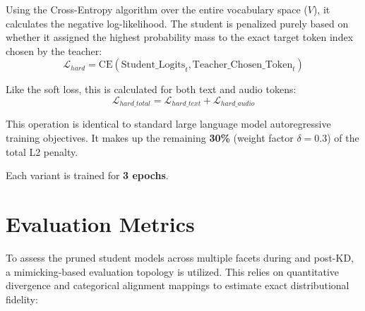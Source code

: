 \documentclass[12pt]{article}
\begin{document}
Using the Cross-Entropy algorithm over the entire vocabulary space ($V$), it calculates the negative log-likelihood. The student is penalized purely based on whether it assigned the highest probability mass to the exact target token index chosen by the teacher:
\[
\mathcal{L}_{hard} = \text{CE}({\mathrm{Student\_Logits}}_{t}, {\mathrm{Teacher\_Chosen\_Token}}_{t})
\]

Like the soft loss, this is calculated for both text and audio tokens:
\[
\mathcal{L}_{hard\_total} = \mathcal{L}_{hard\_text} + \mathcal{L}_{hard\_audio}
\]

This operation is identical to standard large language model autoregressive training objectives. It makes up the remaining \textbf{30\%} (weight factor $\delta = 0.3$) of the total L2 penalty.

Each variant is trained for \textbf{3 epochs}.

\section{Evaluation Metrics}

To assess the pruned student models across multiple facets during and post-KD, a mimicking-based evaluation topology is utilized. This relies on quantitative divergence and categorical alignment mappings to estimate exact distributional fidelity:
\end{document}
